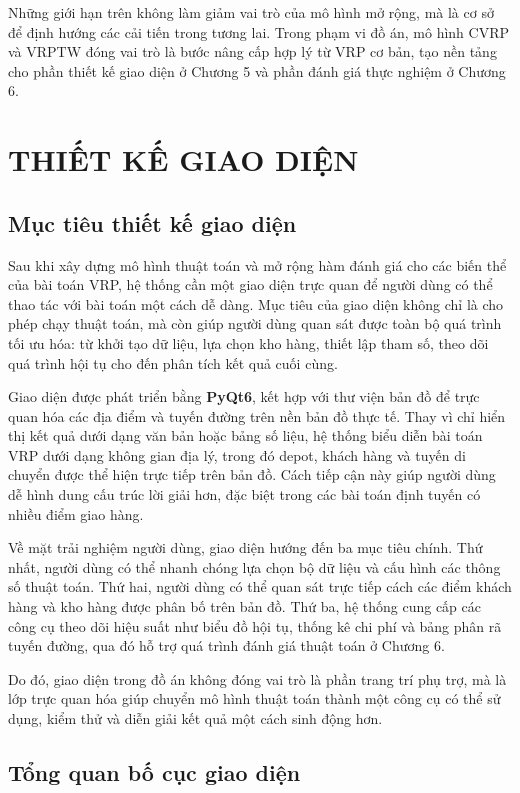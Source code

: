 \documentclass[12pt,a4paper]{article}
\numberwithin{figure}{subsection}
\begin{document}
Những giới hạn trên không làm giảm vai trò của mô hình mở rộng, mà là cơ sở để định hướng các cải tiến trong tương lai. Trong phạm vi đồ án, mô hình CVRP và VRPTW đóng vai trò là bước nâng cấp hợp lý từ VRP cơ bản, tạo nền tảng cho phần thiết kế giao diện ở Chương 5 và phần đánh giá thực nghiệm ở Chương 6.

\section{THIẾT KẾ GIAO DIỆN}

\subsection{Mục tiêu thiết kế giao diện}

Sau khi xây dựng mô hình thuật toán và mở rộng hàm đánh giá cho các biến thể của bài toán VRP, hệ thống cần một giao diện trực quan để người dùng có thể thao tác với bài toán một cách dễ dàng. Mục tiêu của giao diện không chỉ là cho phép chạy thuật toán, mà còn giúp người dùng quan sát được toàn bộ quá trình tối ưu hóa: từ khởi tạo dữ liệu, lựa chọn kho hàng, thiết lập tham số, theo dõi quá trình hội tụ cho đến phân tích kết quả cuối cùng.

Giao diện được phát triển bằng \textbf{PyQt6}, kết hợp với thư viện bản đồ để trực quan hóa các địa điểm và tuyến đường trên nền bản đồ thực tế. Thay vì chỉ hiển thị kết quả dưới dạng văn bản hoặc bảng số liệu, hệ thống biểu diễn bài toán VRP dưới dạng không gian địa lý, trong đó depot, khách hàng và tuyến di chuyển được thể hiện trực tiếp trên bản đồ. Cách tiếp cận này giúp người dùng dễ hình dung cấu trúc lời giải hơn, đặc biệt trong các bài toán định tuyến có nhiều điểm giao hàng.

Về mặt trải nghiệm người dùng, giao diện hướng đến ba mục tiêu chính. Thứ nhất, người dùng có thể nhanh chóng lựa chọn bộ dữ liệu và cấu hình các thông số thuật toán. Thứ hai, người dùng có thể quan sát trực tiếp cách các điểm khách hàng và kho hàng được phân bố trên bản đồ. Thứ ba, hệ thống cung cấp các công cụ theo dõi hiệu suất như biểu đồ hội tụ, thống kê chi phí và bảng phân rã tuyến đường, qua đó hỗ trợ quá trình đánh giá thuật toán ở Chương 6.

Do đó, giao diện trong đồ án không đóng vai trò là phần trang trí phụ trợ, mà là lớp trực quan hóa giúp chuyển mô hình thuật toán thành một công cụ có thể sử dụng, kiểm thử và diễn giải kết quả một cách sinh động hơn.

\subsection{Tổng quan bố cục giao diện}
\end{document}
